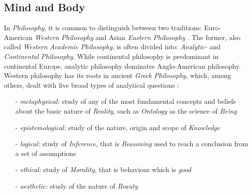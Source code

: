 %
%
%
%
%
%
%

\subsection{Mind and Body}
\label{mind_and_body_heading}

In \emph{Philosophy}, it is common to distinguish between two traditions:
Euro-American \emph{Western Philosophy} and Asian \emph{Eastern Philosophy}
\cite{wikipedia}. The former, also called \emph{Western Academic Philosophy},
is often divided into: \emph{Analytic-} and \emph{Continental Philosophy}.
While continental philosophy is predominant in continental Europe, analytic
philosophy dominates Anglo-American philosophy. Western philosophy has its
roots in ancient \emph{Greek Philosophy}, which, among others, dealt with five
broad types of analytical questions \cite{wikipedia}:

\begin{itemize}
    \item[-] \emph{metaphysical:} study of any of the most fundamental concepts
        and beliefs about the basic nature of \emph{Reality}, such as
        \emph{Ontology} as the science of \emph{Being}
    \item[-] \emph{epistemological:} study of the nature, origin and scope of
        \emph{Knowledge}
    \item[-] \emph{logical:} study of \emph{Inference}, that is \emph{Reasoning}
        used to reach a conclusion from a set of assumptions
    \item[-] \emph{ethical:} study of \emph{Morality}, that is behaviour which
        is \emph{good}
    \item[-] \emph{aesthetic:} study of the nature of \emph{Beauty}
\end{itemize}

